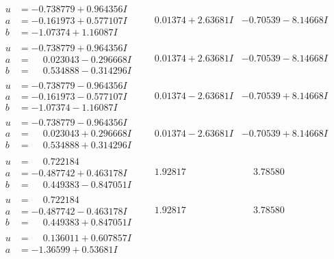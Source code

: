 \documentclass[1p]{elsarticle_modified}
\theoremstyle{definition}
\begin{document}
$$\begin{array}{c|c|c}
\begin{aligned}
u &= -0.738779 + 0.964356 I \\
a &= -0.161973 + 0.577107 I \\
b &= -1.07374 + 1.16087 I\end{aligned}
 & \phantom{-}0.01374 + 2.63681 I & -0.70539 - 8.14668 I \\ \hline\begin{aligned}
u &= -0.738779 + 0.964356 I \\
a &= \phantom{-}0.023043 - 0.296668 I \\
b &= \phantom{-}0.534888 - 0.314296 I\end{aligned}
 & \phantom{-}0.01374 + 2.63681 I & -0.70539 - 8.14668 I \\ \hline\begin{aligned}
u &= -0.738779 - 0.964356 I \\
a &= -0.161973 - 0.577107 I \\
b &= -1.07374 - 1.16087 I\end{aligned}
 & \phantom{-}0.01374 - 2.63681 I & -0.70539 + 8.14668 I \\ \hline\begin{aligned}
u &= -0.738779 - 0.964356 I \\
a &= \phantom{-}0.023043 + 0.296668 I \\
b &= \phantom{-}0.534888 + 0.314296 I\end{aligned}
 & \phantom{-}0.01374 - 2.63681 I & -0.70539 + 8.14668 I \\ \hline\begin{aligned}
u &= \phantom{-}0.722184\phantom{ +0.000000I} \\
a &= -0.487742 + 0.463178 I \\
b &= \phantom{-}0.449383 - 0.847051 I\end{aligned}
 & \phantom{-}1.92817\phantom{ +0.000000I} & \phantom{-}3.78580\phantom{ +0.000000I} \\ \hline\begin{aligned}
u &= \phantom{-}0.722184\phantom{ +0.000000I} \\
a &= -0.487742 - 0.463178 I \\
b &= \phantom{-}0.449383 + 0.847051 I\end{aligned}
 & \phantom{-}1.92817\phantom{ +0.000000I} & \phantom{-}3.78580\phantom{ +0.000000I} \\ \hline\begin{aligned}
u &= \phantom{-}0.136011 + 0.607857 I \\
a &= -1.36599 + 0.53681 I \\

\end{aligned}
\end{array}$$
\end{document}
